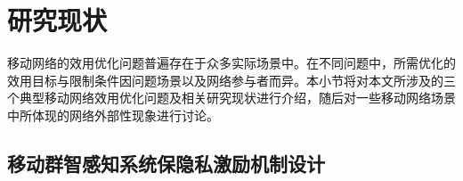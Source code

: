 \section{研究现状}
移动网络的效用优化问题普遍存在于众多实际场景中。在不同问题中，所需优化的效用目标与限制条件因问题场景以及网络参与者而异。本小节将对本文所涉及的三个典型移动网络效用优化问题及相关研究现状进行介绍，随后对一些移动网络场景中所体现的网络外部性现象进行讨论。

\subsection{移动群智感知系统保隐私激励机制设计}

